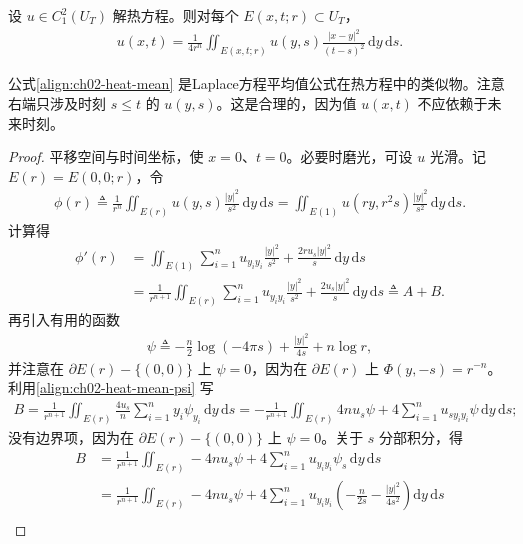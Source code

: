 \documentclass[../../main.tex]{subfiles}
\begin{document}
\begin{theorem}[热方程的一个平均值性质]\label{theorem:ch02-heat-mean}设 $u\in C^2_1(U_T)$ 解热方程。则对每个 $E(x,t;r)\subset U_T$，
\begin{align}\label{align:ch02-heat-mean}
u(x,t)=\frac{1}{4r^n}\iint_{E(x,t;r)}u(y,s)\frac{|x-y|^2}{(t-s)^2}\,\mathrm{d}y\,\mathrm{d}s.
\end{align}
\end{theorem}

公式\eqref{align:ch02-heat-mean} 是Laplace方程平均值公式在热方程中的类似物。注意右端只涉及时刻 $s\leqslant t$ 的 $u(y,s)$。这是合理的，因为值 $u(x,t)$ 不应依赖于未来时刻。

\begin{proof}
平移空间与时间坐标，使 $x=0$、$t=0$。必要时磨光，可设 $u$ 光滑。记 $E(r)=E(0,0;r)$，令
\begin{align}\label{align:ch02-heat-mean-phi}
\phi(r)\triangleq\frac{1}{r^n}\iint_{E(r)}u(y,s)\frac{|y|^2}{s^2}\,\mathrm{d}y\,\mathrm{d}s
=\iint_{E(1)}u(ry,r^2s)\frac{|y|^2}{s^2}\,\mathrm{d}y\,\mathrm{d}s.
\end{align}
计算得
\begin{align*}
\phi'(r)&=\iint_{E(1)}\sum_{i=1}^n u_{y_i y_i}\frac{|y|^2}{s^2}+\frac{2r u_s|y|^2}{s}\,\mathrm{d}y\,\mathrm{d}s\\
&=\frac{1}{r^{n+1}}\iint_{E(r)}\sum_{i=1}^n u_{y_i y_i}\frac{|y|^2}{s^2}+\frac{2u_s|y|^2}{s}\,\mathrm{d}y\,\mathrm{d}s\triangleq A+B.
\end{align*}
再引入有用的函数
\begin{align}\label{align:ch02-heat-mean-psi}
\psi\triangleq-\frac{n}{2}\log(-4\pi s)+\frac{|y|^2}{4s}+n\log r,
\end{align}
并注意在 $\partial E(r)-\{(0,0)\}$ 上 $\psi=0$，因为在 $\partial E(r)$ 上 $\Phi(y,-s)=r^{-n}$。利用\eqref{align:ch02-heat-mean-psi} 写
\begin{align*}
B=\frac{1}{r^{n+1}}\iint_{E(r)}\frac{4u_s}{n}\sum_{i=1}^n y_i\psi_{y_i}\,\mathrm{d}y\,\mathrm{d}s
=-\frac{1}{r^{n+1}}\iint_{E(r)}4n u_s\psi+4\sum_{i=1}^n u_{s y_i y_i}\psi\,\mathrm{d}y\,\mathrm{d}s;
\end{align*}
没有边界项，因为在 $\partial E(r)-\{(0,0)\}$ 上 $\psi=0$。关于 $s$ 分部积分，得
\begin{align*}
B&=\frac{1}{r^{n+1}}\iint_{E(r)}-4n u_s\psi+4\sum_{i=1}^n u_{y_i y_i}\psi_s\,\mathrm{d}y\,\mathrm{d}s\\
&=\frac{1}{r^{n+1}}\iint_{E(r)}-4n u_s\psi+4\sum_{i=1}^n u_{y_i y_i}\left(-\frac{n}{2s}-\frac{|y|^2}{4s^2}\right)\mathrm{d}y\,\mathrm{d}s\\

\end{align*}
\end{proof}
\end{document}

